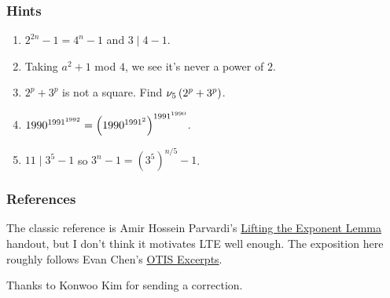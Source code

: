\documentclass[11pt,paper=letter]{scrartcl}
\begin{document}
\subsubsection*{Hints}

\begin{enumerate}
  \item $2^{2n} - 1 = 4^n - 1$ and $3 \mid 4 - 1$.
  \item Taking $a^2 + 1$ mod $4$, we see it's never a power of $2$.
  \item $2^p + 3^p$ is not a square. Find $\nu_5\left( 2^p + 3^p \right)$.
  \item $1990^{1991^{1992}} = \left( 1990^{1991^2} \right)^{1991^{1990}}$.
  \item $11 \mid 3^5 - 1$ so $3^n - 1 = (3^5)^{n/5} - 1$.
\end{enumerate}

\subsubsection*{References}

The classic reference is Amir Hossein Parvardi's \href{https://www.imosuisse.ch/smo/skripte/unused/Lifting_the_exponent_EN.pdf}{Lifting the Exponent Lemma} handout, but I don't think it motivates LTE well enough. The exposition here roughly follows Evan Chen's \href{http://web.evanchen.cc/textbooks/OTIS-Excerpts.pdf}{OTIS Excerpts}.

Thanks to Konwoo Kim for sending a correction. 
\end{document}
